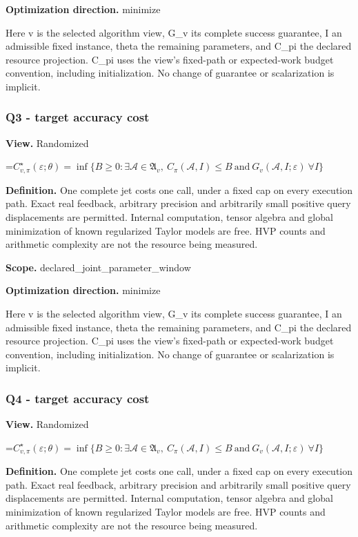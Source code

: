 \documentclass[10pt,a4paper]{article}
\newcommand{\AtlasMath}[1]{\par\begingroup\centering\setbox0=\hbox{$\displaystyle #1$}\ifdim\wd0>1.4\linewidth\typeout{ATLAS WIDE FORMULA: \the\wd0}\fi\ifdim\wd0>\linewidth\resizebox{\linewidth}{!}{\box0}\else\box0\fi\par\endgroup}
\begin{document}
\textbf{Optimization direction.} minimize

Here v is the selected algorithm view, G\_\allowbreak{}v its complete success guarantee, I an admissible fixed instance, theta the remaining parameters, and C\_\allowbreak{}pi the declared resource projection. C\_\allowbreak{}pi uses the view's fixed-path or expected-work budget convention, including initialization. No change of guarantee or scalarization is implicit.

\subsubsection{Q3 - target accuracy cost}
\textbf{View.} Randomized

\AtlasMath{C^\star_{v,\pi}(\varepsilon;\theta)=\inf\{B\ge0:\exists\mathcal A\in\mathfrak A_v,\ C_\pi(\mathcal A,I)\le B\ \text{and}\ G_v(\mathcal A,I;\varepsilon)\ \forall I\}}
\textbf{Definition.} One complete jet costs one call, under a fixed cap on every execution path. Exact real feedback, arbitrary precision and arbitrarily small positive query displacements are permitted. Internal computation, tensor algebra and global minimization of known regularized Taylor models are free. HVP counts and arithmetic complexity are not the resource being measured.

\textbf{Scope.} declared\_\allowbreak{}joint\_\allowbreak{}parameter\_\allowbreak{}window

\textbf{Optimization direction.} minimize

Here v is the selected algorithm view, G\_\allowbreak{}v its complete success guarantee, I an admissible fixed instance, theta the remaining parameters, and C\_\allowbreak{}pi the declared resource projection. C\_\allowbreak{}pi uses the view's fixed-path or expected-work budget convention, including initialization. No change of guarantee or scalarization is implicit.

\subsubsection{Q4 - target accuracy cost}
\textbf{View.} Randomized

\AtlasMath{C^\star_{v,\pi}(\varepsilon;\theta)=\inf\{B\ge0:\exists\mathcal A\in\mathfrak A_v,\ C_\pi(\mathcal A,I)\le B\ \text{and}\ G_v(\mathcal A,I;\varepsilon)\ \forall I\}}
\textbf{Definition.} One complete jet costs one call, under a fixed cap on every execution path. Exact real feedback, arbitrary precision and arbitrarily small positive query displacements are permitted. Internal computation, tensor algebra and global minimization of known regularized Taylor models are free. HVP counts and arithmetic complexity are not the resource being measured.
\end{document}
